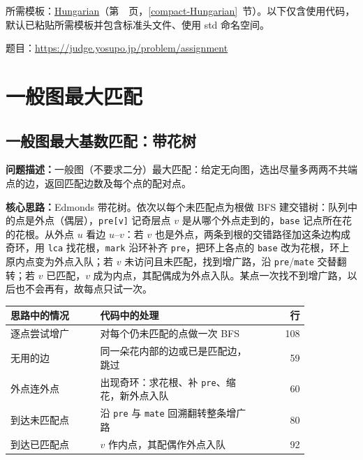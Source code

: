 所需模板：\hyperref[compact-Hungarian]{Hungarian}（第~\pageref{compact-Hungarian}~页，\ref{compact-Hungarian}~节）。以下仅含使用代码，默认已粘贴所需模板并包含标准头文件、使用 std 命名空间。

题目：\url{https://judge.yosupo.jp/problem/assignment}



\Needspace{180pt}

\section{一般图最大匹配}

\subsection{一般图最大基数匹配：带花树}\label{compact-Blossom}

\noindent\textbf{问题描述：}\allowbreak 一般图（不要求二分）最大匹配：给定无向图，选出尽量多两两不共端点的边，返回匹配边数及每个点的配对点。

\textbf{核心思路：}\allowbreak Edmonds 带花树。依次以每个未匹配点为根做 BFS 建交错树：队列中的点是外点（偶层），\texttt{pre[v]} 记奇层点 $v$ 是从哪个外点走到的，\texttt{base} 记点所在花的花根。从外点 $u$ 看边 $u$--$v$：若 $v$ 也是外点，两条到根的交错路径加这条边构成奇环，用 \texttt{lca} 找花根，\texttt{mark} 沿环补齐 \texttt{pre}，把环上各点的 \texttt{base} 改为花根，环上原内点变为外点入队；若 $v$ 未访问且未匹配，找到增广路，沿 \texttt{pre}/\texttt{mate} 交替翻转；若 $v$ 已匹配，$v$ 成为内点，其配偶成为外点入队。某点一次找不到增广路，以后也不会再有，故每点只试一次。

\begin{center}\small
\begin{tabular}{@{}p{0.30\linewidth}p{0.55\linewidth}r@{}}
\toprule
思路中的情况 & 代码中的处理 & 行\\
\midrule
逐点尝试增广 & 对每个仍未匹配的点做一次 BFS & 108\\
无用的边 & 同一朵花内部的边或已是匹配边，跳过 & 59\\
外点连外点 & 出现奇环：求花根、补 \texttt{pre}、缩花，新外点入队 & 60\\
到达未匹配点 & 沿 \texttt{pre} 与 \texttt{mate} 回溯翻转整条增广路 & 80\\
到达已匹配点 & $v$ 作内点，其配偶作外点入队 & 92\\
\bottomrule
\end{tabular}
\end{center}



